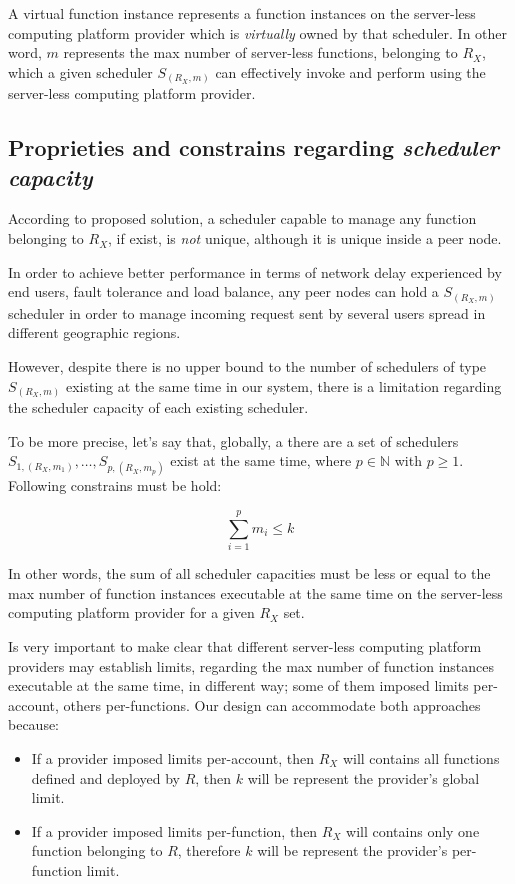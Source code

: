 \documentclass[10pt,a4paper]{article}
\begin{document}
A virtual function instance represents a function instances on the server-less computing platform provider which is \textit{virtually} owned by that scheduler. In other word, $m$ represents the max number of server-less functions, belonging to $R_{X}$, which a given scheduler $S_{({R_{X}},m)}$ can effectively invoke and perform using the server-less computing platform provider.

\subsection{Proprieties and constrains regarding \textit{scheduler capacity}}

According to proposed solution, a scheduler capable to manage any function belonging to $R_{X}$, if exist, is \textit{not} unique, although it is unique inside a peer node. 

In order to achieve better performance in terms of network delay experienced by end users, fault tolerance and load balance, any peer nodes can hold a $S_{({R_{X}},m)}$ scheduler in order to manage incoming request sent by several users spread in different geographic regions. 

However, despite there is no upper bound to the number of schedulers of type $S_{({R_{X}},m)}$ existing at the same time in our system, there is a limitation regarding the scheduler capacity of each existing scheduler. 

To be more precise, let's say that, globally, a there are a set of schedulers $S_{1,({R_{X}},m_1)}, \ldots , S_{p,({R_{X}},m_p)}$ exist at the same time, where $p \in \mathbb{N}$ with $p \geq 1$. Following constrains must be hold:

\begin{equation}
\sum_{i=1}^{p} m_i \leq k
\end{equation}

In other words, the sum of all scheduler capacities must be less or equal to the max number of function instances executable at the same time on the server-less computing platform provider for a given $R_{X}$ set.

Is very important to make clear that different server-less computing platform providers may establish limits, regarding the max number of function instances executable at the same time, in different way; some of them imposed limits per-account, others per-functions. Our design can accommodate both approaches because:
\begin{itemize}
\item If a provider imposed limits per-account, then $R_{X}$ will contains all functions defined and deployed by $R$, then $k$ will be represent the provider's global limit.
\item If a provider imposed limits per-function, then $R_{X}$ will contains only one function belonging to $R$, therefore $k$ will be represent the provider's per-function limit.
\end{itemize}
\end{document}
